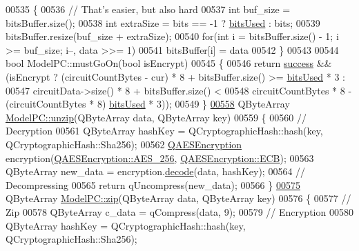 \begin{DoxyCode}
00535 \{
00536     \textcolor{comment}{// That's easier, but also hard}
00537     \textcolor{keywordtype}{int} buf\_size = bitsBuffer.size();
00538     \textcolor{keywordtype}{int} extraSize = bits == -1 ? \hyperlink{class_model_p_c_a655deb6a8afa94c7f4aadb3056989038}{bitsUsed} : bits;
00539     bitsBuffer.resize(buf\_size + extraSize);
00540     \textcolor{keywordflow}{for}(\textcolor{keywordtype}{int} i = bitsBuffer.size() - 1; i >= buf\_size; i--, data >>= 1)
00541         bitsBuffer[i] = data %
00542 \}
00543 
00544 \textcolor{keywordtype}{bool} ModelPC::mustGoOn(\textcolor{keywordtype}{bool} isEncrypt)
00545 \{
00546     \textcolor{keywordflow}{return} \hyperlink{class_model_p_c_a945ffbbc44a832b953c191debd448f4c}{success} && (isEncrypt ? (circuitCountBytes - cur) * 8 + bitsBuffer.size() >= 
      \hyperlink{class_model_p_c_a655deb6a8afa94c7f4aadb3056989038}{bitsUsed} * 3 :
00547                                    circuitData->size() * 8 + bitsBuffer.size() <
00548                                    circuitCountBytes * 8 - (circuitCountBytes * 8)%
      \hyperlink{class_model_p_c_a655deb6a8afa94c7f4aadb3056989038}{bitsUsed} * 3));
00549 \}
\hypertarget{modelpc_8cpp_source_l00558}{}\hyperlink{class_model_p_c_a6da88f166785a49f73b22c169f956fd0}{00558} QByteArray \hyperlink{class_model_p_c_a6da88f166785a49f73b22c169f956fd0}{ModelPC::unzip}(QByteArray data, QByteArray key)
00559 \{
00560     \textcolor{comment}{// Decryption}
00561     QByteArray hashKey = QCryptographicHash::hash(key, QCryptographicHash::Sha256);
00562     \hyperlink{class_q_a_e_s_encryption}{QAESEncryption} encryption(\hyperlink{class_q_a_e_s_encryption_abe48208f4f6c7d68e6a10b49b9d0b7bdacde97774ab1d4c609e04b0dd13a1e1f7}{QAESEncryption::AES\_256}, 
      \hyperlink{class_q_a_e_s_encryption_ad3e031c49a3d56566379d75b40b7b255a4ca7f51778e2adf1f464164a0ba8e75e}{QAESEncryption::ECB});
00563     QByteArray new\_data = encryption.\hyperlink{class_q_a_e_s_encryption_a58f972f2b66c2454edd5112495463bba}{decode}(data, hashKey);
00564     \textcolor{comment}{// Decompressing}
00565     \textcolor{keywordflow}{return} qUncompress(new\_data);
00566 \}
\hypertarget{modelpc_8cpp_source_l00575}{}\hyperlink{class_model_p_c_afebbbfa4b07deba4f68fc6dfb50f353f}{00575} QByteArray \hyperlink{class_model_p_c_afebbbfa4b07deba4f68fc6dfb50f353f}{ModelPC::zip}(QByteArray data, QByteArray key)
00576 \{
00577     \textcolor{comment}{// Zip}
00578     QByteArray c\_data = qCompress(data, 9);
00579     \textcolor{comment}{// Encryption}
00580     QByteArray hashKey = QCryptographicHash::hash(key, QCryptographicHash::Sha256);

\end{DoxyCode}
